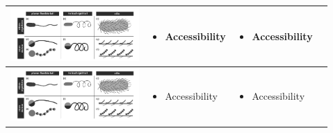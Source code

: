 \documentclass[a4paper,11pt]{article}
\begin{document}
\begin{sloppypar}
\begin{table}[h!]
\begin{tabular}{ c  m{3cm}  m{3cm} m{3cm} }
 \begin{minipage}{.3\textwidth}
      \includegraphics[width=\linewidth, height=20mm]{cilia}
    \end{minipage}
    &
      \begin{itemize}
        \item Accessibility
      
      \end{itemize}
    & 
      \begin{itemize}
        \item Accessibility
   
      \end{itemize}
    \\ \hline

 \begin{minipage}{.3\textwidth}
      \includegraphics[width=\linewidth, height=20mm]{cilia}
    \end{minipage}
    &
      \begin{itemize}
        \item Accessibility
        
      \end{itemize}
    & 
      \begin{itemize}
        \item Accessibility
    
      \end{itemize}
    \\ \hline



\end{tabular}
\end{table}
\end{sloppypar}
\end{document}
